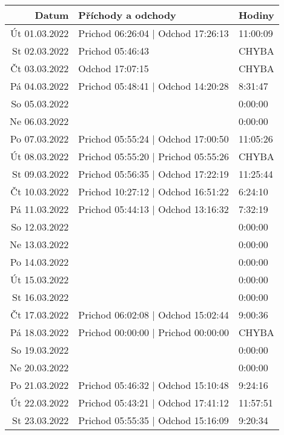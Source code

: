 \documentclass[10pt, a4paper]{article}%
\begin{document}
\begin{table}[ht!]
    \centering
        \begin{tabularx}{\textwidth}{|d|X|h}
        \hline

        \textbf{Datum}         & \textbf{Příchody a odchody}       & \textbf{Hodiny} \\ \hline
        Út 01.03.2022 &  Prichod 06:26:04 | Odchod 17:26:13  & 11:00:09  \\ \hline
St 02.03.2022 &  Prichod 05:46:43  & CHYBA  \\ \hline
Čt 03.03.2022 &  Odchod 17:07:15  & CHYBA  \\ \hline
Pá 04.03.2022 &  Prichod 05:48:41 | Odchod 14:20:28  & 8:31:47  \\ \hline
So 05.03.2022 &  & 0:00:00  \\ \hline
Ne 06.03.2022 &  & 0:00:00  \\ \hline
Po 07.03.2022 &  Prichod 05:55:24 | Odchod 17:00:50  & 11:05:26  \\ \hline
Út 08.03.2022 &  Prichod 05:55:20 | Prichod 05:55:26  & CHYBA  \\ \hline
St 09.03.2022 &  Prichod 05:56:35 | Odchod 17:22:19  & 11:25:44  \\ \hline
Čt 10.03.2022 &  Prichod 10:27:12 | Odchod 16:51:22  & 6:24:10  \\ \hline
Pá 11.03.2022 &  Prichod 05:44:13 | Odchod 13:16:32  & 7:32:19  \\ \hline
So 12.03.2022 &  & 0:00:00  \\ \hline
Ne 13.03.2022 &  & 0:00:00  \\ \hline
Po 14.03.2022 &  & 0:00:00  \\ \hline
Út 15.03.2022 &  & 0:00:00  \\ \hline
St 16.03.2022 &  & 0:00:00  \\ \hline
Čt 17.03.2022 &  Prichod 06:02:08 | Odchod 15:02:44  & 9:00:36  \\ \hline
Pá 18.03.2022 &  Prichod 00:00:00 | Prichod 00:00:00  & CHYBA  \\ \hline
So 19.03.2022 &  & 0:00:00  \\ \hline
Ne 20.03.2022 &  & 0:00:00  \\ \hline
Po 21.03.2022 &  Prichod 05:46:32 | Odchod 15:10:48  & 9:24:16  \\ \hline
Út 22.03.2022 &  Prichod 05:43:21 | Odchod 17:41:12  & 11:57:51  \\ \hline
St 23.03.2022 &  Prichod 05:55:35 | Odchod 15:16:09  & 9:20:34  \\ \hline

\end{tabularx}
\end{table}
\end{document}
